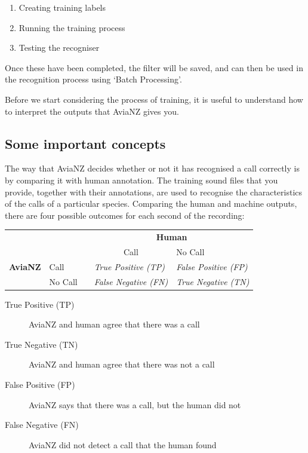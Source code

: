\documentclass{article}
\begin{document}
\begin{enumerate}
\item Creating training labels
\item Running the training process
\item Testing the recogniser
\end{enumerate}

Once these have been completed, the filter will be saved, and can then be used in the recognition process using `Batch Processing'. 

Before we start considering the process of training, it is useful to understand how to interpret the outputs that AviaNZ gives you. 

\subsection{Some important concepts}\label{sec:metrics}

The way that AviaNZ decides whether or not it has recognised a call correctly is by comparing it with human annotation. The training sound files that you provide, together with their annotations, are used to recognise the characteristics of the calls of a particular species. Comparing the human and machine outputs, there are four possible outcomes for each second of the recording:

\begin{center}
\begin{tabular}{lllll}
&          &  & \multicolumn{2}{c}{\textbf{Human}}   \\
\cmidrule(lr){4-5}
             &          &  & \multicolumn{1}{c}{Call}                                               & No Call                                                               \\
 \textbf{AviaNZ}                  &\vline \hspace{0.25cm}Call     &  & \textit{True Positive (TP)}  & \textit{False Positive (FP)} \\
                  &\vline \hspace{0.25cm}No Call &  & \textit{False Negative (FN)} & \textit{True Negative (TN)}  \\
\end{tabular}
\end{center}

\begin{description}
\item[True Positive (TP)] AviaNZ and human agree that there was a call 
\item[True Negative (TN)] AviaNZ and human agree that there was not a call
\item[False Positive (FP)] AviaNZ says that there was a call, but the human did not
\item[False Negative (FN)] AviaNZ did not detect a call that the human found
\end{description}
\end{document}
